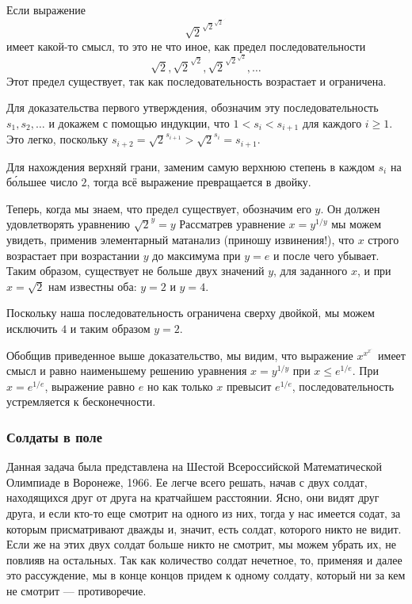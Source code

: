 Если выражение
$${\sqrt{2}}^{{\sqrt{2}}^{{\sqrt{2}}^{{\cdot}^{\cdot^{\cdot}}}}}$$
имеет какой-то смысл, то это не что иное, как предел последовательности
$${\sqrt{2}}, {\sqrt{2}}^{{\sqrt{2}}}, {\sqrt{2}}^{{\sqrt{2}}^{{\sqrt{2}}}},\dots$$
Этот предел существует, так как последовательность возрастает и ограничена.


Для доказательства первого утверждения, обозначим эту последовательность
$s_1, s_2,\dots$ и докажем с помощью индукции, что $1<s_i<s_{i+1}$
для каждого $i\ge 1$.  
Это легко, поскольку $s_{i+2}={\sqrt{2}}^{s_{i+1}}>{\sqrt{2}}^{s_{i}}=s_{i+1}$.

Для нахождения верхняй грани, заменим самую верхнюю степень в каждом $s_i$  на б\'{о}льшее число $2$, тогда всё выражение превращается в двойку.


Теперь, когда мы знаем, что предел существует, обозначим его $y$.
Он должен удовлетворять уравнению
${\sqrt{2}}^y=y$
Рассматрев уравнение $x=y^{1/y}$  
мы можем увидеть, применив элементарный матанализ  (приношу  извинения!), 
что $x$ строго возрастает при возрастании $y$ до максимума при $y=e$
и после чего убывает. 
Таким образом, существует не больше двух значений $y$, для заданного $x$, 
и при $x=\sqrt{2}$ нам известны оба: $y=2$ и $y=4$.

Поскольку наша последовательность ограничена сверху двойкой, мы можем исключить $4$ и таким образом $y=2$.\heart


Обобщив приведенное выше доказательство, мы видим, что выражение $x^{x^{x^{{\cdot}^{\cdot}}}}$
имеет смысл и равно наименьшему решению уравнения $x=y^{1/y}$ при $x\le e^{1/e}$.
При $x=e^{1/e}$, выражение равно $e$ но как только $x$ превысит $e^{1/e}$, последовательность устремляется к бесконечности.






\subsubsection*{Солдаты в поле}%



Данная задача была представлена на Шестой Всероссийской  Математической Олимпиаде в Воронеже, 1966.  Ее легче всего решать, начав с двух солдат, находящихся друг от друга на кратчайшем расстоянии.  Ясно, они видят друг друга, и если кто-то еще смотрит на одного  из них, тогда у нас имеется содат, за которым присматривают дважды и, значит, есть солдат, которого никто не видит.
Если же на этих двух солдат больше никто не смотрит, мы можем убрать их, не повлияв на остальных. Так как количество солдат нечетное, то, применяя и далее это рассуждение, мы в конце концов придем к одному солдату, который ни за кем не смотрит --- противоречие.\heart


